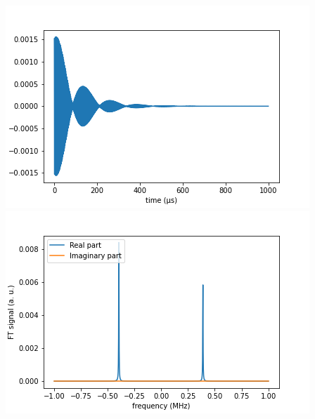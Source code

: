 \documentclass[10pt]{beamer}
\begin{document}
\begin{frame}
\begin{columns}[T]
\begin{column}{.5\textwidth}
\begin{column}{.5\textwidth}
\end{column}
\end{column}
\begin{column}{.5\textwidth}
\includegraphics[width=\textwidth]{./spin1-2/42correlated_mixed_dipD2/FIDSignal.png}
\includegraphics[width=\textwidth]{./spin1-2/42correlated_mixed_dipD2/FTSignal.png}
\end{column}
\end{columns}
\end{frame}
\end{document}
